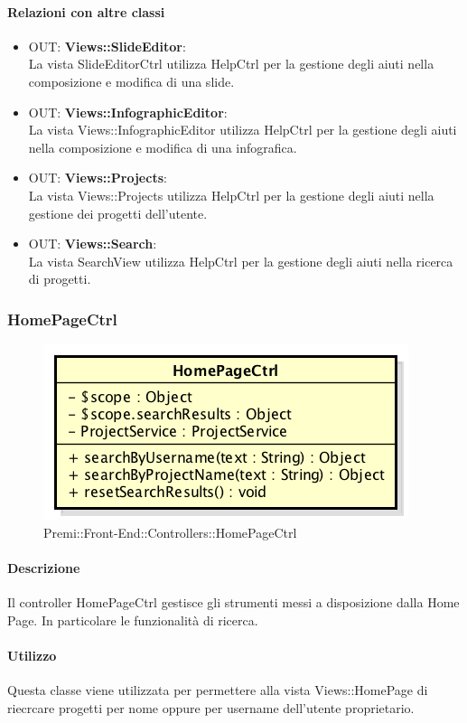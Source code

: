 	\paragraph{Relazioni con altre classi}
	\begin{itemize}
	 \item OUT: \textbf{Views::SlideEditor}:\\
		La vista SlideEditorCtrl utilizza HelpCtrl per la gestione degli aiuti nella composizione e modifica di una slide.
	 \item OUT: \textbf{Views::InfographicEditor}:\\
		La vista Views::InfographicEditor utilizza HelpCtrl per la gestione degli aiuti nella composizione e modifica di una infografica.
	 \item OUT: \textbf{Views::Projects}:\\
		La vista Views::Projects utilizza HelpCtrl per la gestione degli aiuti nella gestione dei progetti dell'utente.
	 \item OUT: \textbf{Views::Search}:\\
		La vista SearchView utilizza HelpCtrl per la gestione degli aiuti nella ricerca di progetti.
	\end{itemize}

\newpage
\subsubsection{HomePageCtrl}
\begin{figure}[h]
	\centering
	\includegraphics[width=0.5\linewidth]{img/premi_front_end_controllers_homepagectrl}
	\caption[Premi::Front-End::Controllers::HomePageCtrl]{Premi::Front-End::Controllers::HomePageCtrl}
\end{figure}
\paragraph{Descrizione}
Il controller HomePageCtrl gestisce gli strumenti messi a disposizione dalla Home Page. In particolare le funzionalità di ricerca.

\paragraph{Utilizzo}
Questa classe viene utilizzata per permettere alla vista Views::HomePage di riecrcare progetti per nome oppure per username dell'utente proprietario.\\
